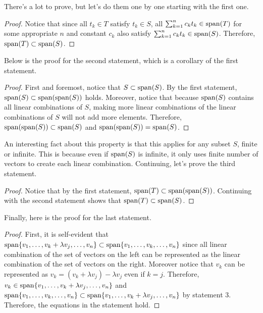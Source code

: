 \documentclass[../../main.tex]{subfiles}
\begin{document}
There's a lot to prove, but let's do them one by one starting with
the first one.

\begin{proof}
Notice that since all $t_k \in T$ satisfy $t_k \in S$, all
$\sum_{k=1}^n c_k t_k \in \operatorname{span}(T)$ for some appropriate $n$ and
constant $c_k$ also satisfy $\sum_{k=1}^n c_k t_k \in \operatorname{span}(S)$.
Therefore, $\operatorname{span}(T) \subset \operatorname{span}(S)$.
\end{proof}

Below is the proof for the second statement, which is a corollary
of the first statement.

\begin{proof}
First and foremost, notice that $S \subset \operatorname{span}(S)$. By the first
statement, $\operatorname{span}(S) \subset \operatorname{span}(\operatorname{span}(S))$ holds. Moreover,
notice that because $\operatorname{span}(S)$ contains all linear combinations of
$S$, making more linear combinations of the linear combinations of
$S$ will not add more elements. Therefore, $\operatorname{span}(\operatorname{span}(S)) \subset
\operatorname{span}(S)$ and $\operatorname{span}(\operatorname{span}(S)) = \operatorname{span}(S)$.
\end{proof}

An interesting fact about this property is that this applies for
any subset $S$, finite or infinite. This is because even if $\operatorname{span}(S)$
is infinite, it only uses finite number of vectors to create
each linear combination. Continuing, let's prove the third statement.

\begin{proof}
Notice that by the first statement, $\operatorname{span}(T) \subset
\operatorname{span}(\operatorname{span}(S))$. Continuing with the second statement shows that
$\operatorname{span}(T) \subset \operatorname{span}(S)$.
\end{proof}

Finally, here is the proof for the last statement.

\begin{proof}
First, it is self-evident that $\Span\{ v_1, \ldots, v_k
+ \lambda v_j, \ldots, v_n \} \subset \Span\{ v_1, \linebreak \ldots,
v_k, \ldots, v_n \}$ since all linear combination of the set of
vectors on the left can be represented as the linear combination of
the set of vectors on the right. Moreover notice that $v_k$ can be
represented as $v_k = (v_k + \lambda v_j) - \lambda v_j$ even if
$k = j$. Therefore, $v_k \in \operatorname{span}\{ v_1, \ldots, v_k + \lambda v_j,
\ldots, v_n \}$ and $\Span\{ v_1, \ldots, v_k, \ldots, v_n \} \subset
\Span\{ v_1, \ldots, v_k + \lambda v_j, \linebreak \ldots, v_n \}$ by
statement 3. Therefore, the equations in the statement hold.
\end{proof}
\end{document}
